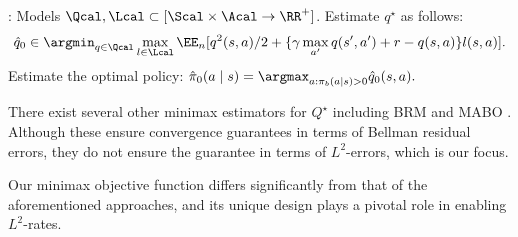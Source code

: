 \begin{algorithm}[!t]
\caption{MQP (Minimax $Q^{\star}$-learning with Penalization)}\label{alg:main2}
\begin{algorithmic}[1]
  :  Models $\Qcal,\Lcal \subset [\Scal \times \Acal \to \RR^{+}]$. 
    \STATE   Estimate $q^{\star}$ as follows:
    \begin{align}\label{eq:q_objective}
        \hat q_{0}\in \argmin_{q\in \Qcal}\max_{l\in \Lcal}\EE_n[q^2(s,a)/2+  %
        \{\gamma \max_{a'} q(s',a')+r-q(s,a)\}l(s,a)]. %
    \end{align}
   \STATE Estimate the optimal policy: $
       \hat \pi_{0}(a\mid s)=  \argmax_{a: \pi_b(a\mid s)>0}\hat q_{0}(s,a).$
\end{algorithmic}
\end{algorithm}


\begin{remark}\label{rem:difference_q_star}
There exist several other minimax estimators for $Q^{\star}$ including BRM \citep{antos2008learning} and MABO \citep{xie2020q}. {\newedit Although these ensure convergence guarantees in terms of Bellman residual errors, they do not ensure the guarantee in terms of $L^2$-errors, which is our focus.}

Our minimax objective function differs significantly from that of the aforementioned approaches, and its unique design plays a pivotal role in enabling $L^2$-rates.
\end{remark}


